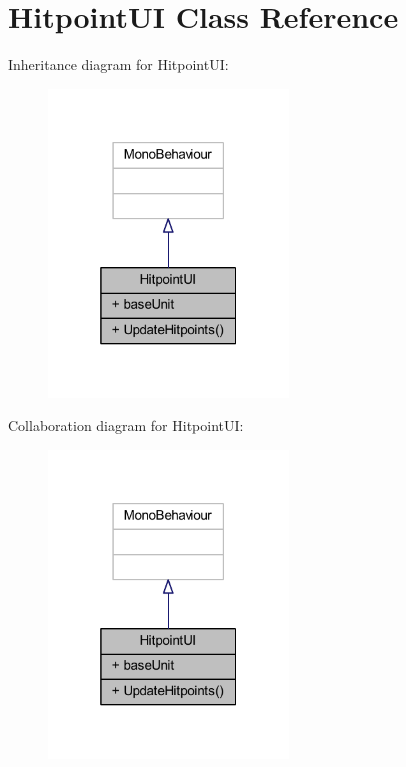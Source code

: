 \hypertarget{class_hitpoint_u_i}{}\section{Hitpoint\+UI Class Reference}
\label{class_hitpoint_u_i}


Inheritance diagram for Hitpoint\+UI\+:\nopagebreak
\begin{figure}[H]
\begin{center}
\leavevmode
\includegraphics[width=181pt]{class_hitpoint_u_i__inherit__graph}
\end{center}
\end{figure}


Collaboration diagram for Hitpoint\+UI\+:\nopagebreak
\begin{figure}[H]
\begin{center}
\leavevmode
\includegraphics[width=181pt]{class_hitpoint_u_i__coll__graph}
\end{center}
\end{figure}
